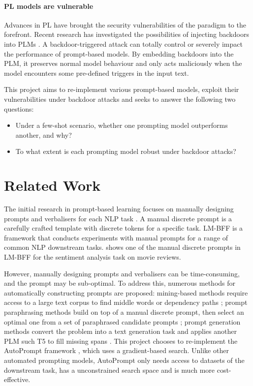 \vspace{-0.8em}
\paragraph{PL models are vulnerable} Advances in PL have brought the security vulnerabilities of the paradigm to the forefront. Recent research has investigated the possibilities of injecting backdoors into PLMs \cite{Lei22, Du22}. A backdoor-triggered attack can totally control or severely impact the performance of prompt-based models. By embedding backdoors into the PLM, it preserves normal model behaviour and only acts maliciously when the model encounters some pre-defined triggers in the input text. 

\vspace{1em}
This project aims to re-implement various prompt-based models, exploit their vulnerabilities under backdoor attacks and seeks to answer the following two questions:
\begin{itemize}[topsep=0pt, itemsep=0.8pt, partopsep=0pt]
    \item Under a few-shot scenario, whether one prompting model outperforms another, and why?
    \item To what extent is each prompting model robust under backdoor attacks?
\end{itemize}

\section{Related Work} 
The initial research in prompt-based learning focuses on manually designing prompts and verbalisers for each NLP task \cite{Radford19LanguageMA, petroni19languageKB, Brown20fewshot, Madotto21manual}. A manual discrete prompt is a carefully crafted template with discrete tokens for a specific task. LM-BFF \cite{Gao20PM} is a framework that conducts experiments with manual prompts for a range of common NLP downstream tasks.  shows one of the manual discrete prompts in LM-BFF for the sentiment analysis task on movie reviews. 

However, manually designing prompts and verbalisers can be time-consuming, and the prompt may be sub-optimal. To address this, numerous methods for automatically constructing prompts are proposed: mining-based methods require access to a large text corpus to find middle words or dependency paths \cite{jiang20Auto}; prompt paraphrasing methods build on top of a manual discrete prompt, then select an optimal one from a set of paraphrased candidate prompts \cite{Yuan21Auto};  prompt generation methods convert the problem into a text generation task and applies another PLM such T5 to fill missing spans \cite{Ben-David21Auto}. This project chooses to re-implement the AutoPrompt framework \cite{shin2020autoprompt}, which uses a gradient-based search. Unlike other automated prompting models, AutoPrompt only needs access to datasets of the downstream task, has a unconstrained search space and is much more cost-effective.


